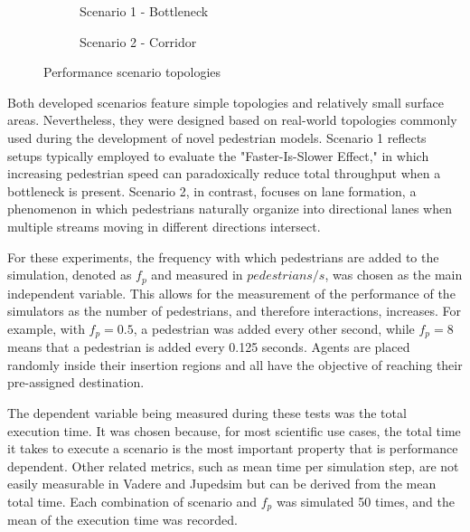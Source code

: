\documentclass[twoside, 11pt]{article}
\begin{document}
\begin{figure}[h]
  \centering
  \begin{subfigure}{.33\textwidth}
    \centering
    
    \caption{Scenario 1 -  Bottleneck}
    \label{fig:sfig1}
  \end{subfigure}%
  \begin{subfigure}{.67\textwidth}
    \centering
    
    \caption{Scenario 2 - Corridor}
    \label{fig:sfig1}
  \end{subfigure}%
  \caption{Performance scenario topologies}
  \label{fig:performace_scenario_topologies}
\end{figure}

Both developed scenarios feature simple topologies and relatively small surface areas. Nevertheless, they were designed based on real-world topologies commonly used during the development of novel pedestrian models. Scenario 1 reflects setups typically employed to evaluate the "Faster-Is-Slower Effect," in which increasing pedestrian speed can paradoxically reduce total throughput when a bottleneck is present. Scenario 2, in contrast, focuses on lane formation, a phenomenon in which pedestrians naturally organize into directional lanes when multiple streams moving in different directions intersect.

For these experiments, the frequency with which pedestrians are added to the simulation, denoted as $f_p$ and measured in $pedestrians/s$, was chosen as the main independent variable. This allows for the measurement of the performance of the simulators as the number of pedestrians, and therefore interactions, increases. For example, with $f_p = 0.5$, a pedestrian was added every other second, while $f_p = 8$ means that a pedestrian is added every 0.125 seconds. Agents are placed randomly inside their insertion regions and all have the objective of reaching their pre-assigned destination.

The dependent variable being measured during these tests was the total execution time. It was chosen because, for most scientific use cases, the total time it takes to execute a scenario is the most important property that is performance dependent. Other related metrics, such as mean time per simulation step, are not easily measurable in Vadere and Jupedsim but can be derived from the mean total time. Each combination of scenario and $f_p$ was simulated 50 times, and the mean of the execution time was recorded.
\end{document}
